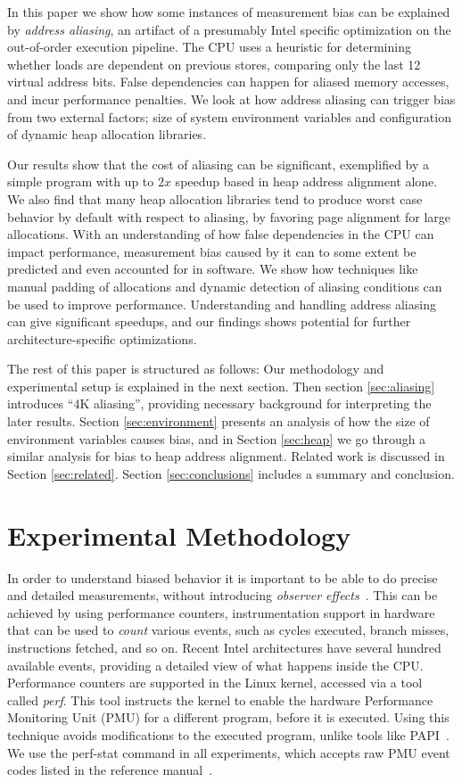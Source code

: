 \documentclass[prodmode,acmtaco]{acmsmall}
\begin{document}
In this paper we show how some instances of measurement bias can be explained by \emph{address aliasing}, an artifact of a presumably Intel specific optimization on the out-of-order execution pipeline.
The CPU uses a heuristic for determining whether loads are dependent on previous stores, comparing only the last 12 virtual address bits.
False dependencies can happen for aliased memory accesses, and incur performance penalties.
We look at how address aliasing can trigger bias from two external factors; size of system environment variables and configuration of dynamic heap allocation libraries.

Our results show that the cost of aliasing can be significant, exemplified by a simple program with up to $2x$ speedup based in heap address alignment alone.
We also find that many heap allocation libraries tend to produce worst case behavior by default with respect to aliasing, by favoring page alignment for large allocations.
With an understanding of how false dependencies in the CPU can impact performance, measurement bias caused by it can to some extent be predicted and even accounted for in software.
We show how techniques like manual padding of allocations and dynamic detection of aliasing conditions can be used to improve performance. 
Understanding and handling address aliasing can give significant speedups, and our findings shows potential for further architecture-specific optimizations.

The rest of this paper is structured as follows: Our methodology and experimental setup is explained in the next section.
Then section \ref{sec:aliasing} introduces ``4K aliasing'', providing necessary background for interpreting the later results.
Section \ref{sec:environment} presents an analysis of how the size of environment variables causes bias, and in Section \ref{sec:heap} we go through a similar analysis for bias to heap address alignment.
Related work is discussed in Section \ref{sec:related}.
Section \ref{sec:conclusions} includes a summary and conclusion.


\section{Experimental Methodology}
\label{sec:methodology}
In order to understand biased behavior it is important to be able to do precise and detailed measurements, without introducing \emph{observer effects}~\cite{Mytkowicz:2008:OE&MB}.
This can be achieved by using performance counters, instrumentation support in hardware that can be used to \emph{count} various events, such as cycles executed, branch misses, instructions fetched, and so on.
Recent Intel architectures have several hundred available events, providing a detailed view of what happens inside the CPU.
Performance counters are supported in the Linux kernel, accessed via a tool called \emph{perf}.
This tool instructs the kernel to enable the hardware Performance Monitoring Unit (PMU) for a different program, before it is executed.
Using this technique avoids modifications to the executed program, unlike tools like PAPI~\cite{PAPI:PortableInterface}.
We use the perf-stat command in all experiments, which accepts raw PMU event codes listed in the reference manual~\cite{Volume3B}.
\end{document}
